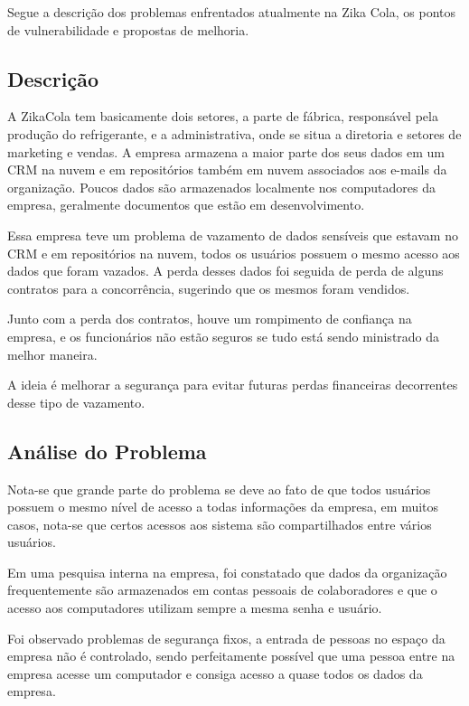 \documentclass[12pt]{article}
\begin{document}
Segue a descrição dos problemas enfrentados atualmente na Zika Cola, os pontos de vulnerabilidade e propostas de melhoria.

\subsection{Descrição}

A ZikaCola tem basicamente dois setores, a parte de fábrica, responsável pela produção do refrigerante, e a administrativa, onde se situa a diretoria e setores de marketing e vendas. A empresa armazena a maior parte dos seus dados em um CRM na nuvem e em repositórios também em nuvem associados aos e-mails da organização. Poucos dados são armazenados localmente nos computadores da empresa, geralmente documentos que estão em desenvolvimento.

Essa empresa teve um problema de vazamento de dados sensíveis que estavam no CRM e em repositórios na nuvem, todos os usuários possuem o mesmo acesso aos dados que foram vazados. A perda desses dados foi seguida de perda de alguns contratos para a concorrência, sugerindo que os mesmos foram vendidos.

Junto com a perda dos contratos, houve um rompimento de confiança na empresa, e os funcionários não estão seguros se tudo está sendo ministrado da melhor maneira.

A ideia é melhorar a segurança para evitar futuras perdas financeiras decorrentes desse tipo de vazamento.

\subsection{Análise do Problema}

Nota-se que grande parte do problema se deve ao fato de que todos usuários possuem o mesmo nível de acesso a todas informações da empresa, em muitos casos, nota-se que certos acessos aos sistema são compartilhados entre vários usuários.

Em uma pesquisa interna na empresa, foi constatado que dados da organização frequentemente são armazenados em contas pessoais de colaboradores e que o acesso aos computadores utilizam sempre a mesma senha e usuário.

Foi observado problemas de segurança fixos, a entrada de pessoas no espaço da empresa não é controlado, sendo perfeitamente possível que uma pessoa entre na empresa acesse um computador e consiga acesso a quase todos os dados da empresa. 
\end{document}
